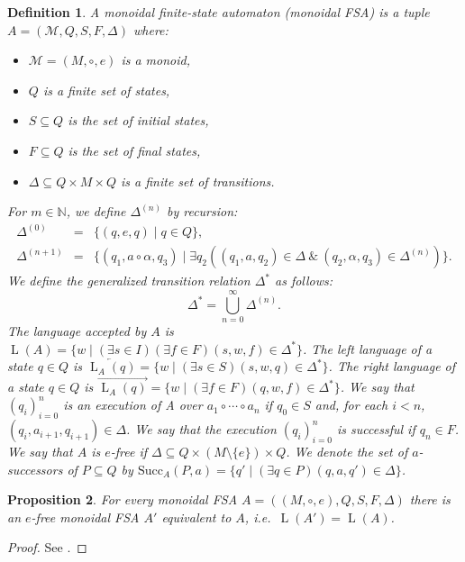 \documentclass{article}
\newtheorem{definition}{Definition}[section]
\newtheorem{proposition}[definition]{Proposition}
\DeclareMathOperator{\Lang}{L}
\begin{document}
	\begin{definition} \label{def:monoidal_automaton}
		A monoidal finite-state automaton (monoidal FSA) is a tuple $A = (\mathcal{M}, Q, S, F, \Delta)$ where:
		\begin{itemize}
			\item $\mathcal{M} = (M, \circ, e)$ is a monoid,
			\item $Q$ is a finite set of states,
			\item $S\subseteq Q$ is the set of initial states,
			\item $F\subseteq Q$ is the set of final states,
			\item $\Delta\subseteq Q\times M\times Q$ is a finite set of transitions.
		\end{itemize}
		For $m\in \mathbb{N}$, we define $\Delta^{(n)}$ by recursion:
		\begin{eqnarray*}
			\Delta^{(0)} & = & \{ (q, e, q)\mid q\in Q \}, \\
			\Delta^{(n+1)} & = & \{ (q_1, a\circ\alpha, q_3)\mid \exists q_2((q_1, a, q_2)\in\Delta\ \&\ (q_2, \alpha, q_3)\in\Delta^{(n)}) \}.
		\end{eqnarray*}
		We define the generalized transition relation $\Delta^*$ as follows:
		\[ \Delta^* = \bigcup_{n=0}^\infty \Delta^{(n)}. \]
		The language accepted by $A$ is $\Lang(A) = \{ w \mid (\exists s\in I)(\exists f\in F)(s, w, f)\in \Delta^* \}$.
		The left language of a state $q\in Q$ is $\overleftarrow{\Lang_A(q)} = \{ w \mid (\exists s\in S)(s, w, q)\in \Delta^* \}$.
		The right language of a state $q\in Q$ is $\overrightarrow{\Lang_A(q)} = \{ w \mid (\exists f\in F)(q, w, f)\in \Delta^* \}$.
		We say that $(q_i)_{i=0}^n$ is an execution of A over $a_1\circ\cdots\circ a_n$ if $q_0\in S$ and, for each $i<n$, $(q_i, a_{i+1}, q_{i+1})\in\Delta$. We say that the execution $(q_i)_{i=0}^n$ is successful if $q_n\in F$.
		We say that $A$ is $e$-free if $\Delta\subseteq Q\times (M\setminus\{e\})\times Q$.
		We denote the set of $a$-successors of $P\subseteq Q$ by $\mathrm{Succ}_A(P, a) = \{ q' \mid (\exists q\in P)(q, a, q')\in \Delta \}$.
	\end{definition}

	\begin{proposition} \label{prop:e-free}
		For every monoidal FSA $A = ((M, \circ, e), Q, S, F, \Delta)$ there is an $e$-free monoidal FSA $A'$ equivalent to $A$, i.e.\ $\Lang(A')=\Lang(A)$.
	\end{proposition}
	\begin{proof}
		See \cite[proposition~2.5.4]{Mihov-FST-2019}.
	\end{proof}
\end{document}
